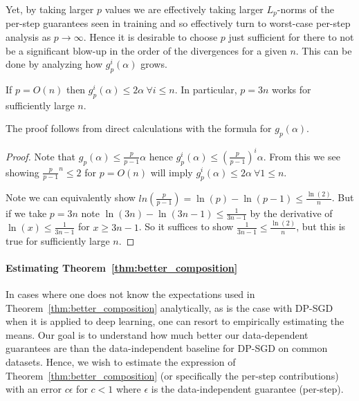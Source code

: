 Yet, by taking larger $p$ values we are effectively taking larger $L_{p}$-norms of the per-step guarantees seen in training and so effectively turn to worst-case per-step analysis as $p \rightarrow \infty$. Hence it is desirable to choose $p$ just sufficient for there to not be a significant blow-up in the order of the divergences for a given $n$. This can be done by analyzing how $g_{p}^{i}(\alpha)$ grows.

\begin{fact}\label{fact:p_control}
    If $p = O(n)$ then $g_{p}^i(\alpha) \leq 2 \alpha~\forall i \leq n$. In particular, $p = 3n$ works for sufficiently large $n$.
\end{fact}

The proof follows from direct calculations with the formula for $g_{p}(\alpha)$. 

\begin{proof}

Note that $g_{p}(\alpha) \leq \frac{p}{p-1}\alpha$ hence $g_{p}^{i}(\alpha) \leq (\frac{p}{p-1})^{i}\alpha$. From this we see showing $\frac{p}{p-1}^{n} \leq 2$ for $p = O(n)$ will imply $g_p^{i}(\alpha) \leq 2 \alpha~\forall 1 \leq n$.

Note we can equivalently show $ln(\frac{p}{p-1}) = \ln(p) - \ln(p-1) \leq \frac{\ln (2)}{n}$. But if we take $p = 3n$ note $\ln(3n) - \ln(3n-1) \leq \frac{1}{3n-1}$ by the derivative of $\ln(x) \leq \frac{1}{3n-1}$ for $x \geq 3n-1$. So it suffices to show $\frac{1}{3n-1} \leq \frac{\ln(2)}{n}$, but this is true for sufficiently large $n$.

    
\end{proof}


\paragraph{Estimating Theorem~\ref{thm:better_composition}}


In cases where one does not know the expectations used in Theorem~\ref{thm:better_composition} analytically, as is the case with DP-SGD when it is applied to deep learning, one can resort to empirically estimating the means. Our goal is to understand how much better our data-dependent guarantees are than the data-independent baseline for DP-SGD on common datasets. Hence, we wish to estimate the expression of Theorem~\ref{thm:better_composition} (or specifically the per-step contributions) with an error
$c \epsilon$ for $c < 1$ where $\epsilon$ is the data-independent guarantee (per-step). 


